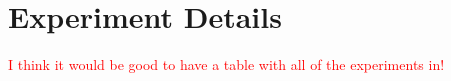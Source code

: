 \documentclass[draft]{agujournal2019}
\newcommand{\red}[1]{\textcolor{red}{#1}}
\begin{document}






\section{Experiment Details}
\red{I think it would be good to have a table with all of the experiments in!}
\end{document}
